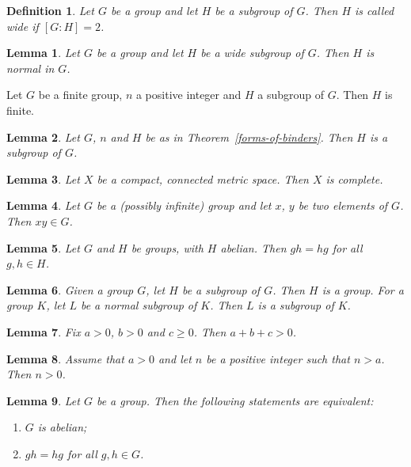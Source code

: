 \documentclass{article}
\newtheorem{lemma}{Lemma}
\newtheorem{definition}{Definition}
\begin{document}
\begin{definition}\label{notion-of-a-variable}
Let $G$ be a group and let $H$ be a subgroup of $G$. Then $H$ is called \emph{wide} if $[G:H]=2$.
\end{definition}

\begin{lemma}\label{wide-subgroup}
Let $G$ be a group and let $H$ be a wide subgroup of $G$. Then $H$ is normal in $G$.
\end{lemma}

\begin{theorem}\label{forms-of-binders}
Let $G$ be a finite group, $n$ a positive integer and $H$ a subgroup of $G$. Then $H$ is finite.
\end{theorem}

\begin{lemma}\label{as-in}
Let $G$, $n$ and $H$ be as in Theorem~\ref{forms-of-binders}. Then $H$ is a subgroup of $G$.
\end{lemma}

\begin{lemma}\label{adjective-commas}
Let $X$ be a compact, connected metric space. Then $X$ is complete.
\end{lemma}

\begin{lemma}\label{possibly-infinite}
Let $G$ be a (possibly infinite) group and let $x$, $y$ be two elements of $G$. Then $xy\in G$.
\end{lemma}

\begin{lemma}\label{with-absolute}
Let $G$ and $H$ be groups, with $H$ abelian. Then $gh=hg$ for all $g,h\in H$.
\end{lemma}

\begin{lemma}\label{given-let}
Given a group $G$, let $H$ be a subgroup of $G$. Then $H$ is a group. For a group $K$, let $L$ be a normal subgroup of $K$. Then $L$ is a subgroup of $K$.
\end{lemma}

\begin{lemma}\label{fix-several}
Fix $a>0$, $b>0$ and $c\ge 0$. Then $a+b+c>0$.
\end{lemma}

\begin{lemma}\label{assume-let}
Assume that $a>0$ and let $n$ be a positive integer such that $n>a$. Then $n>0$.
\end{lemma}

\begin{lemma}\label{equivalent-statements}
Let $G$ be a group. Then the following statements are equivalent:
\begin{enumerate}
\item[(i)] $G$ is abelian;
\item[(ii)] $gh=hg$ for all $g,h\in G$.
\end{enumerate}
\end{lemma}
\end{document}
